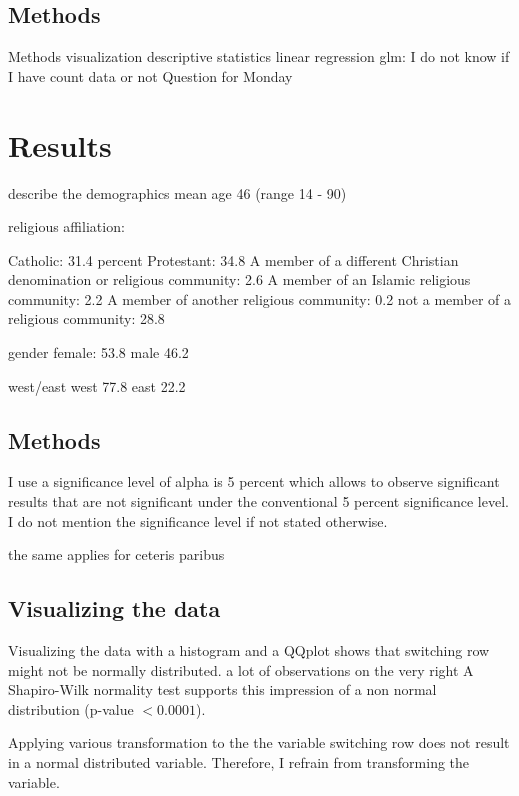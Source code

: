 \documentclass[12pt,a4paper]{article}
\begin{document}
\subsection{Methods}
Methods
visualization  
descriptive statistics 
linear regression 
glm: I do not know if I have count data or not 
Question for Monday 

\section{Results}


describe the demographics 
mean age 46 (range 14 - 90) 

religious affiliation: 

Catholic: 31.4 percent
Protestant: 34.8 
A member of a different Christian denomination or religious community: 2.6
A member of an Islamic religious community: 2.2 
A member of another religious community: 0.2 
not a member of a religious community: 28.8 

gender 
female: 53.8
male 46.2 

west/east 
west 77.8 
east 22.2
\subsection{Methods}



I use a significance level of alpha is 5 percent which allows to observe significant results that are not significant under the conventional 5 percent significance level. I do not mention the significance level if not stated otherwise. 

the same applies for ceteris paribus 

\subsection{Visualizing the data }
Visualizing the data with a histogram and a QQplot shows that switching row might not be normally distributed. 
a lot of observations on the very right   
A Shapiro-Wilk normality test supports this impression of a non normal distribution (p-value $< 0.0001$).\\
\begin{figure}
\scalebox{0.8}{
}
\end{figure}
Applying various transformation to the the variable switching row does not result in a normal distributed variable. Therefore, I refrain from transforming the variable. 
\end{document}
